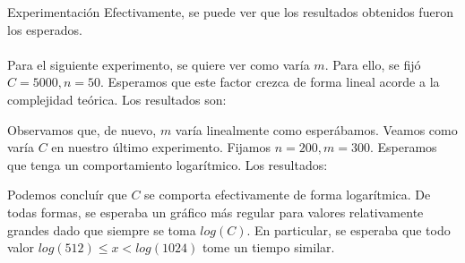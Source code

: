 \begin{subsection}{Experimentaci\'{o}n}
Efectivamente, se puede ver que los resultados obtenidos fueron los esperados. \\ \\
Para el siguiente experimento, se quiere ver como var\'{i}a $m$. Para ello, se fij\'{o} $C=5000, n=50$. Esperamos que este factor crezca de forma lineal acorde a la complejidad te\'{o}rica. Los resultados son:

\begin{figure}[H]
\centering
{}
\end{figure}

Observamos que, de nuevo, $m$ var\'{i}a linealmente como esper\'{a}bamos. Veamos como var\'{i}a $C$ en nuestro \'{u}ltimo experimento. Fijamos $n=200, m=300$. Esperamos que tenga un comportamiento logar\'{i}tmico. Los resultados: 

\begin{figure}[H]
\centering
{}
\end{figure}

Podemos conclu\'{i}r que $C$ se comporta efectivamente de forma logar\'{i}tmica. De todas formas, se esperaba un gr\'{a}fico m\'{a}s regular para valores relativamente grandes dado que siempre se toma $log(C)$. En particular, se esperaba que todo valor $log(512) \leq x < log(1024)$ tome un tiempo similar.

\end{subsection}